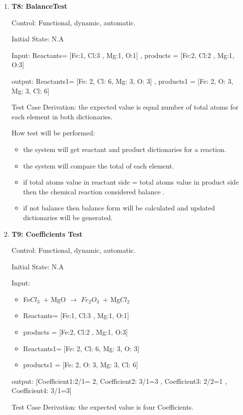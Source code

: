 \documentclass[12pt, titlepage]{article}
\begin{document}
\begin{enumerate}
\item{\bf T8: BalanceTest\\}

Control: Functional, dynamic, automatic.
					
Initial State: N.A
					
Input: Reactants= [Fe:1, Cl:3 , Mg:1, O:1] , products = [Fe:2, Cl:2 , Mg:1, O:3]

output: Reactants1=  [Fe: 2, Cl: 6, Mg: 3, O: 3]  , products1 = [Fe: 2, O: 3, Mg: 3, Cl: 6]

Test Case Derivation: the expected value is equal number of total atoms for each element in both dictionaries.

How test will be performed: 
\begin{itemize}
\item the system will get reactant  and product dictionaries for a reaction. 
\item the system will compare the total of each element.
\item if total atoms value in reactant side = total atoms value in product side then the chemical reaction considered balance . 
\item if not balance then balance form will be calculated and updated dictionaries will be generated.
\end{itemize}

\item{\bf T9: Coefficients Test\\}

Control: Functional, dynamic, automatic.
					
Initial State: N.A
					
Input: 
\begin{itemize}
\item Fe$Cl_3$ + MgO $\rightarrow$ $Fe_2$$O_3$ + Mg$Cl_2$ 
\item Reactants= [Fe:1, Cl:3 , Mg:1, O:1] 
\item products = [Fe:2, Cl:2 , Mg:1, O:3] 
\item Reactants1=  [Fe: 2, Cl: 6, Mg: 3, O: 3] 
\item products1 = [Fe: 2, O: 3, Mg: 3, Cl: 6] 
\end{itemize}
output: [Coefficient1:2/1= 2, Coefficient2: 3/1=3 , Coefficient3: 2/2=1 , Coefficient4: 3/1=3]

Test Case Derivation: the expected value is four Coefficients.


\end{enumerate}
\end{document}
